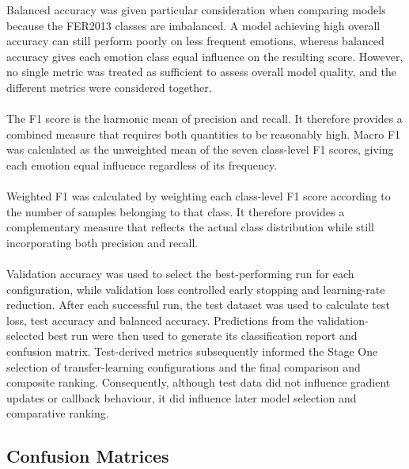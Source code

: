 \documentclass[12pt, a4paper]{report}
\let\oldsubsection\subsection
\renewcommand{\subsection}{%
    \Needspace{6\baselineskip}%
    \oldsubsection
}
\begin{document}
				\noindent
				Balanced accuracy was given particular consideration when comparing models because the FER2013 classes are imbalanced. A model achieving high overall accuracy can still perform poorly on less frequent emotions, whereas balanced accuracy gives each emotion class equal influence on the resulting score. However, no single metric was treated as sufficient to assess overall model quality, and the different metrics were considered together.\\\\
				The F1 score is the harmonic mean of precision and recall. It therefore provides a combined measure that requires both quantities to be reasonably high. Macro F1 was calculated as the unweighted mean of the seven class-level F1 scores, giving each emotion equal influence regardless of its frequency.\\\\
				Weighted F1 was calculated by weighting each class-level F1 score according to the number of samples belonging to that class. It therefore provides a complementary measure that reflects the actual class distribution while still incorporating both precision and recall.\\\\
				Validation accuracy was used to select the best-performing run for each configuration, while validation loss controlled early stopping and learning-rate reduction. After each successful run, the test dataset was used to calculate test loss, test accuracy and balanced accuracy. Predictions from the validation-selected best run were then used to generate its classification report and confusion matrix. Test-derived metrics subsequently informed the Stage One selection of transfer-learning configurations and the final comparison and composite ranking. Consequently, although test data did not influence gradient updates or callback behaviour, it did influence later model selection and comparative ranking.
				
			\subsection{Confusion Matrices}
				
\end{document}

